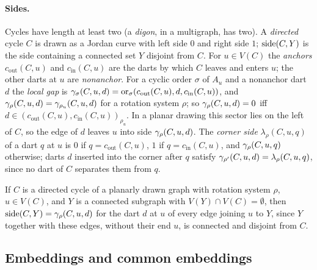 \paragraph{Sides.}
Cycles have length at least two (a \emph{digon}, in a multigraph, has two).
A \emph{directed} cycle $C$ is drawn as a Jordan curve with left side $0$
and right side $1$; $\operatorname{side}(C,Y)$ is the side containing a connected set $Y$
disjoint from $C$. For $u\in V(C)$ the \emph{anchors}
$c_{\mathrm{out}}(C,u)$ and $c_{\mathrm{in}}(C,u)$ are the darts by which
$C$ leaves and enters $u$; the other darts at $u$ are \emph{nonanchor}. For
a cyclic order $\sigma$ of $A_u$ and a nonanchor dart $d$ the \emph{local
gap} is $\gamma_\sigma(C,u,d)=\operatorname{or}_{\sigma}(c_{\mathrm{out}}(C,u),
d,c_{\mathrm{in}}(C,u))$, and $\gamma_\rho(C,u,d)=\gamma_{\rho_u}(C,u,d)$ for a
rotation system $\rho$; so $\gamma_\rho(C,u,d)=0$ iff
$d\in(c_{\mathrm{out}}(C,u),c_{\mathrm{in}}(C,u))_{\rho_u}$. In a planar
drawing this sector lies on the left of $C$, so the edge of $d$ leaves $u$
into side $\gamma_\rho(C,u,d)$. The \emph{corner side} $\lambda_\rho(C,u,q)$
of a dart $q$ at $u$ is $0$ if $q=c_{\mathrm{out}}(C,u)$, $1$ if
$q=c_{\mathrm{in}}(C,u)$, and $\gamma_\rho(C,u,q)$ otherwise; darts $d$
inserted into the corner after $q$ satisfy
$\gamma_{\rho'}(C,u,d)=\lambda_\rho(C,u,q)$, since no dart of $C$ separates
them from $q$.

\begin{lemma}[sector]\label{lem:v4-sector}
If $C$ is a directed cycle of a planarly drawn graph with rotation system
$\rho$, $u\in V(C)$, and $Y$ is a connected subgraph with $V(Y)\cap
V(C)=\emptyset$, then $\operatorname{side}(C,Y)=\gamma_\rho(C,u,d)$ for the dart $d$ at $u$
of every edge joining $u$ to $Y$, since $Y$ together with these edges,
without their end $u$, is connected and disjoint from $C$.
\end{lemma}

\subsection{Embeddings and common embeddings}\label{sec:v4-emb}

